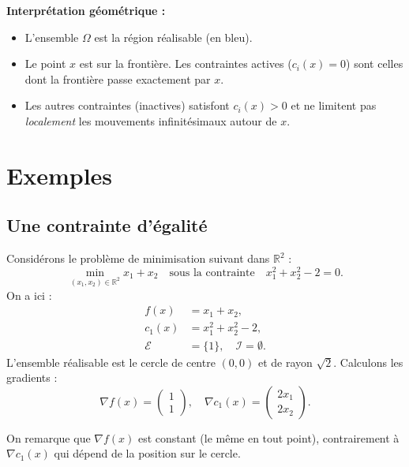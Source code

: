 \begin{figureexplanation}
\textbf{Interprétation géométrique :}
\begin{itemize}
    \item L'ensemble $\Omega$ est la région réalisable (en bleu).
    \item Le point $x$ est sur la frontière. Les contraintes actives ($c_i(x)=0$) sont celles dont la frontière passe exactement par $x$.
    \item Les autres contraintes (inactives) satisfont $c_i(x) > 0$ et ne limitent pas \emph{localement} les mouvements infinitésimaux autour de $x$.
\end{itemize}
\end{figureexplanation}

\section{Exemples}

\subsection{Une contrainte d'égalité}

Considérons le problème de minimisation suivant dans $\mathbb{R}^2$ :
\begin{equation}
    \min_{(x_1, x_2) \in \mathbb{R}^2} x_1 + x_2 \quad \text{sous la contrainte} \quad x_1^2 + x_2^2 - 2 = 0.
\end{equation}
On a ici :
\begin{align*}
    f(x) &= x_1 + x_2, \\
    c_1(x) &= x_1^2 + x_2^2 - 2, \\
    \mathcal{E} &= \{1\}, \quad \mathcal{I} = \emptyset.
\end{align*}
L'ensemble réalisable est le cercle de centre $(0,0)$ et de rayon $\sqrt{2}$.
Calculons les gradients :
\begin{equation}
    \nabla f(x) = \begin{pmatrix} 1 \\ 1 \end{pmatrix}, \quad \nabla c_1(x) = \begin{pmatrix} 2x_1 \\ 2x_2 \end{pmatrix}.
\end{equation}

On remarque que $\nabla f(x)$ est constant (le même en tout point), contrairement à $\nabla c_1(x)$ qui dépend de la position sur le cercle.

